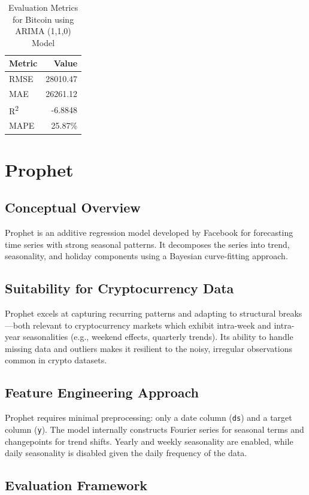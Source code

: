 \documentclass[12pt,a4paper]{report}
\begin{document}
\begin{table}[h]
\centering
\caption{Evaluation Metrics for Bitcoin using ARIMA (1,1,0) Model}
\label{tab:arima-bitcoin-metrics}
\begin{tabular}{lr}
\toprule
\textbf{Metric} & \textbf{Value} \\
\midrule
RMSE & 28010.47 \\
MAE & 26261.12 \\
R\textsuperscript{2} & -6.8848 \\
MAPE & 25.87\% \\
\bottomrule
\end{tabular}
\end{table}

\section{Prophet}
\subsection{Conceptual Overview}
Prophet is an additive regression model developed by Facebook for forecasting time series with strong seasonal patterns. It decomposes the series into trend, seasonality, and holiday components using a Bayesian curve-fitting approach.

\subsection{Suitability for Cryptocurrency Data}
Prophet excels at capturing recurring patterns and adapting to structural breaks—both relevant to cryptocurrency markets which exhibit intra-week and intra-year seasonalities (e.g., weekend effects, quarterly trends). Its ability to handle missing data and outliers makes it resilient to the noisy, irregular observations common in crypto datasets.

\subsection{Feature Engineering Approach}
Prophet requires minimal preprocessing: only a date column (\texttt{ds}) and a target column (\texttt{y}). The model internally constructs Fourier series for seasonal terms and changepoints for trend shifts. Yearly and weekly seasonality are enabled, while daily seasonality is disabled given the daily frequency of the data.

\subsection{Evaluation Framework}
\end{document}
